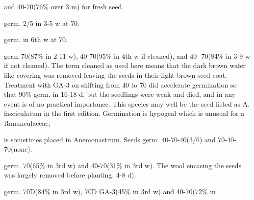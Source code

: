 \begin{description}
and 40-70(76\% over 3 m) for fresh seed.
\item[A. demissa] germ. 2/5 in 3-5 w at 70.
\item[A. drummondi] germ. in 6th w at 70.
\item[A. fasciculata] germ 70(87\% in 2-11 w), 40-70(95\% in 4th w if cleaned), and 40-
70(84\% in 3-9 w if not cleaned). The term cleaned as used here means that the dark
brown wafer like covering was removed leaving the seeds in their light brown seed
coat. Treatment with GA-3 on shifting from 40 to 70 did accelerate germination so that
90\% germ. in 16-18 d, but the seedlings were weak and died, and in any event is of no
practical importance. This species may well be the seed listed as A. fasciculatum in
the first edition. Germination is hypogeal which is unusual for a Ranunculaceae;
\item[A. fasciculatum var. roseum] is sometimes placed in Anemonastrum. Seeds
germ. 40-70-40(3/6) and 70-40-70(none).
\item[A. kurilensis] germ. 70(65\% in 3rd w) and 40-70(31\% in 3rd w). The wool
encasing the seeds was largely removed before planting. 4-8 d).
\item[A. lesseri] germ. 70D(84\% in 3rd w), 70D GA-3(45\% in 3rd w) and 40-70(72\% in


\end{description}
